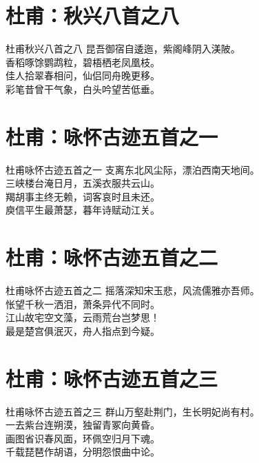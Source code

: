 \documentclass[12pt,oneside,a5paper]{book}
\begin{document}
\chapter{杜甫：秋兴八首之八}
\begin{poemzh}{杜甫}{秋兴八首之八}
昆吾御宿自逶迤，紫阁峰阴入渼陂。\\
香稻啄馀鹦鹉粒，碧梧栖老凤凰枝。\\
佳人拾翠春相问，仙侣同舟晚更移。\\
彩笔昔曾干气象，白头吟望苦低垂。\\
\end{poemzh}

\chapter{杜甫：咏怀古迹五首之一}
\begin{poemzh}{杜甫}{咏怀古迹五首之一}
支离东北风尘际，漂泊西南天地间。\\
三峡楼台淹日月，五溪衣服共云山。\\
羯胡事主终无赖，词客哀时且未还。\\
庾信平生最萧瑟，暮年诗赋动江关。\\ 
\end{poemzh}

\chapter{杜甫：咏怀古迹五首之二}
\begin{poemzh}{杜甫}{咏怀古迹五首之二}
摇落深知宋玉悲，风流儒雅亦吾师。\\
怅望千秋一洒泪，萧条异代不同时。\\
江山故宅空文藻，云雨荒台岂梦思！\\
最是楚宫俱泯灭，舟人指点到今疑。\\ 
\end{poemzh}

\chapter{杜甫：咏怀古迹五首之三}
\begin{poemzh}{杜甫}{咏怀古迹五首之三}
群山万壑赴荆门，生长明妃尚有村。\\
一去紫台连朔漠，独留青冢向黄昏。\\
画图省识春风面，环佩空归月下魂。\\
千载琵琶作胡语，分明怨恨曲中论。\\ 
\end{poemzh}
\end{document}

